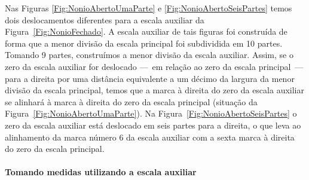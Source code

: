 Nas Figuras \ref{Fig:NonioAbertoUmaParte} e \ref{Fig:NonioAbertoSeisPartes} temos dois deslocamentos diferentes para a escala auxiliar da Figura~\ref{Fig:NonioFechado}. A escala auxiliar de tais figuras foi construída de forma que a menor divisão da escala principal foi subdividida em 10 partes. Tomando 9 partes, construímos a menor divisão da escala auxiliar. Assim, se o zero da escala auxiliar for deslocado ---~em relação ao zero da escala principal~--- para a direita por uma distância equivalente a um décimo da largura da menor divisão da escala principal, temos que a marca à direita do zero da escala auxiliar se alinhará à marca à direita do zero da escala principal (situação da Figura~\ref{Fig:NonioAbertoUmaParte}). Na Figura~\ref{Fig:NonioAbertoSeisPartes} o zero da escala auxiliar está deslocado em seis partes para a direita, o que leva ao alinhamento da marca número 6 da escala auxiliar com a sexta marca à direita do zero da escala principal.

\paragraph{Tomando medidas utilizando a escala auxiliar}

